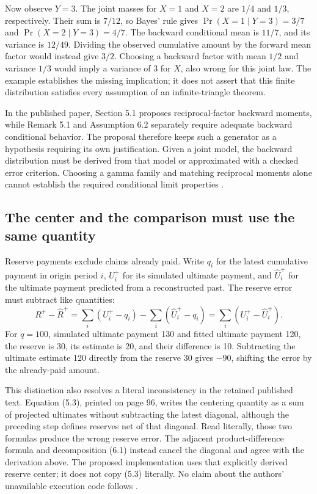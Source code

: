 Now observe $Y=3$. The joint masses for $X=1$ and $X=2$ are $1/4$ and
$1/3$, respectively. Their sum is $7/12$, so Bayes' rule gives
$\Pr(X=1\mid Y=3)=3/7$ and $\Pr(X=2\mid Y=3)=4/7$.
The backward conditional mean is $11/7$, and its variance is $12/49$.
Dividing the observed cumulative amount by the forward mean factor would
instead give $3/2$. Choosing a backward factor with mean $1/2$ and variance
$1/3$ would imply a variance of 3 for $X$, also wrong for this joint law.
The example establishes the missing implication; it does not assert that this
finite distribution satisfies every assumption of an infinite-triangle theorem.

In the published paper, Section 5.1 proposes reciprocal-factor backward
moments, while Remark 5.1 and Assumption 6.2 separately require adequate
backward conditional behavior. The proposal therefore keeps such a generator
as a hypothesis requiring its own justification. Given a joint model, the
backward distribution must be derived from that model or approximated with a
checked error criterion. Choosing a gamma family and matching reciprocal
moments alone cannot establish the required conditional limit properties
\citep[Section 5.1, Remark 5.1 and Assumption 6.2]{steinmetz2024bootstrap}.

\subsection{The center and the comparison must use the same quantity}

Reserve payments exclude claims already paid. Write $q_i$ for the latest
cumulative payment in origin period $i$, $U_i^+$ for its simulated ultimate
payment, and $\widehat U_i^+$ for the ultimate payment predicted from a
reconstructed past. The reserve error must subtract like quantities:
\[
 R^+-\widehat R^+
 =\sum_i(U_i^+-q_i)-\sum_i(\widehat U_i^+-q_i)
 =\sum_i(U_i^+-\widehat U_i^+).
\]
For $q=100$, simulated ultimate payment 130 and fitted ultimate payment 120,
the reserve is 30, its estimate is 20, and their difference is 10.
Subtracting the ultimate estimate 120 directly from the reserve 30 gives
$-90$, shifting the error by the already-paid amount.

This distinction also resolves a literal inconsistency in the retained
published text. Equation (5.3), printed on page 96, writes the centering
quantity as a sum of projected ultimates without subtracting the latest
diagonal, although the preceding step defines reserves net of that diagonal.
Read literally, those two formulas produce the wrong reserve error. The
adjacent product-difference formula and decomposition (6.1) instead cancel
the diagonal and agree with the derivation above. The proposed implementation
uses that explicitly derived reserve center; it does not copy (5.3) literally.
No claim about the authors' unavailable execution code follows
\citep[Section 5.1, equation 5.3 and equation 6.1]{steinmetz2024bootstrap}.

